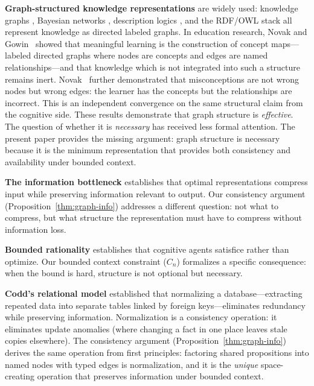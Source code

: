 \documentclass[11pt]{article}
\theoremstyle{definition}
\begin{document}
\textbf{Graph-structured knowledge representations} are widely used:
knowledge graphs \cite{Hogan2021}, Bayesian networks \cite{Pearl1988},
description logics \cite{BaaderCalvaneseEtAl2003}, and the
RDF/OWL stack \cite{BernersLee2001} all represent knowledge as directed
labeled graphs. In education research, Novak and Gowin~\cite{Novak1984}
showed that meaningful learning is the construction of concept maps---labeled
directed graphs where nodes are concepts and edges are named
relationships---and that knowledge which is not integrated into such a
structure remains inert. Novak~\cite{Novak1990} further demonstrated that
misconceptions are not wrong nodes but wrong edges: the learner has the
concepts but the relationships are incorrect. This is an independent
convergence on the same structural claim from the cognitive side.
These results demonstrate that graph structure is
\emph{effective}. The question of whether it is \emph{necessary} has
received less formal attention. The present paper provides the missing
argument: graph structure is necessary because it is the minimum
representation that provides both consistency and availability under
bounded context.

\textbf{The information bottleneck} \cite{Tishby2000} establishes that
optimal representations compress input while preserving information
relevant to output. Our consistency argument
(Proposition~\ref{thm:graph-info}) addresses a different question: not what
to compress, but what structure the representation must have to compress
without information loss.

\textbf{Bounded rationality} \cite{Simon1955} establishes that cognitive
agents satisfice rather than optimize. Our bounded context constraint
($C_n$) formalizes a specific consequence: when the bound is hard,
structure is not optional but necessary.

\textbf{Codd's relational model} \cite{Codd1970} established that normalizing
a database---extracting repeated data into separate tables linked by
foreign keys---eliminates redundancy while preserving information.
Normalization is a consistency operation: it eliminates update anomalies
(where changing a fact in one place leaves stale copies elsewhere).
The consistency argument (Proposition~\ref{thm:graph-info})
derives the same operation from first principles: factoring
shared propositions into named nodes with typed edges is normalization,
and it is the \emph{unique} space-creating operation that preserves
information under bounded context.

\end{document}
